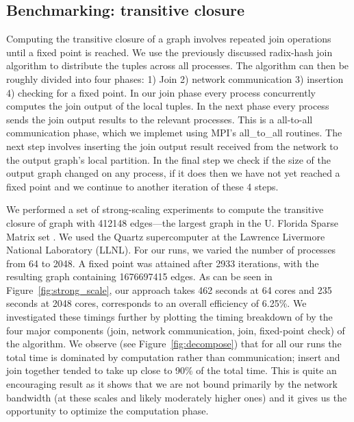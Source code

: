 \subsection{Benchmarking: transitive closure}
%
Computing the transitive closure of a graph involves repeated join operations until a fixed point is reached.
We use the previously discussed radix-hash join algorithm to distribute the tuples across all processes.
The algorithm can then be roughly divided into four phases: 1) Join 2) network communication 3) insertion 4) checking for a fixed point.
In our join phase every process concurrently computes the join output of the local tuples. In the next phase every process sends the join output results to the relevant processes. This is a all-to-all communication phase, which we implemet using MPI's all\_to\_all routines. The next step involves inserting the join output result received from the network to the output graph's local partition. In the final step we check if the size of the output graph changed on any process, if it does then we have not yet reached a fixed point and we continue to another iteration of these 4 steps.


We performed a set of strong-scaling experiments to compute the transitive closure of graph with 412148 edges---the largest graph in the U. Florida Sparse Matrix set \cite{UF:SPMC}. We used the Quartz supercomputer at the Lawrence Livermore National Laboratory (LLNL). For our runs, we varied the number of processes from 64 to 2048. A fixed point was attained after 2933 iterations, with the resulting graph containing 1676697415 edges. As can be seen in Figure~\ref{fig:strong_scale}, our approach takes 462 seconds at 64 cores and 235 seconds at 2048 cores, corresponds to an overall efficiency of 6.25\%. We investigated these timings further by plotting the timing breakdown of by the four major components (join, network communication, join, fixed-point check) of the algorithm. We observe (see Figure~\ref{fig:decompose}) that for all our runs the total time is dominated by computation rather than communication; insert and join together tended to take up close to 90\% of the total time. This is quite an encouraging result  as it shows that we are not bound primarily by the network bandwidth (at these scales and likely moderately higher ones) and it gives us the opportunity to optimize the computation phase.

